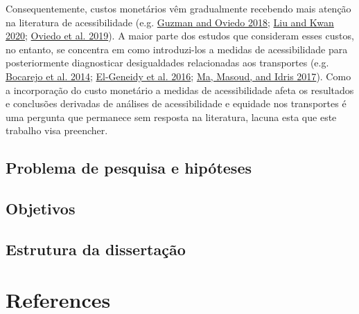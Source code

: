\documentclass[msc,numbers]{coppe}
\begin{document}
  Consequentemente, custos monetários vêm gradualmente recebendo mais atenção na literatura de acessibilidade (e.g. \protect\hyperlink{ref-guzman2018accessibility}{Guzman and Oviedo 2018}; \protect\hyperlink{ref-liu2020measuring}{Liu and Kwan 2020}; \protect\hyperlink{ref-oviedo2019bus}{Oviedo et al. 2019}). A maior parte dos estudos que consideram esses custos, no entanto, se concentra em como introduzi-los a medidas de acessibilidade para posteriormente diagnosticar desigualdades relacionadas aos transportes (e.g. \protect\hyperlink{ref-bocarejo2014innovative}{Bocarejo et al. 2014}; \protect\hyperlink{ref-el-geneidy2016cost}{El-Geneidy et al. 2016}; \protect\hyperlink{ref-ma2017modeling}{Ma, Masoud, and Idris 2017}). Como a incorporação do custo monetário a medidas de acessibilidade afeta os resultados e conclusões derivadas de análises de acessibilidade e equidade nos transportes é uma pergunta que permanece sem resposta na literatura, lacuna esta que este trabalho visa preencher.

  \hypertarget{problema-de-pesquisa-e-hipuxf3teses}{%
  \section{Problema de pesquisa e hipóteses}\label{problema-de-pesquisa-e-hipuxf3teses}}

  \hypertarget{objetivos}{%
  \section{Objetivos}\label{objetivos}}

  \hypertarget{estrutura-da-dissertauxe7uxe3o}{%
  \section{Estrutura da dissertação}\label{estrutura-da-dissertauxe7uxe3o}}

  \hypertarget{references}{%
  \chapter*{References}\label{references}}

  
  
\end{document}
